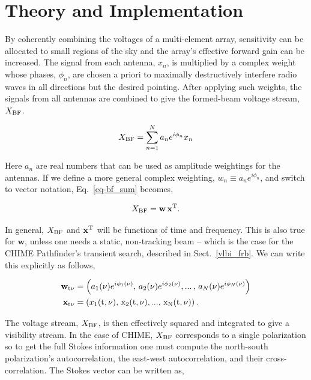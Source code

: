   
\section{Theory and Implementation}
\label{sec:theory}

By coherently combining the voltages of a multi-element array, 
sensitivity can be allocated to small regions of the sky and 
the array's effective forward gain can be increased. The signal 
from each antenna, $x_n$, is multiplied by a complex weight whose 
phases, $\phi_{n}$, are chosen a priori to maximally destructively interfere radio waves 
in all directions but the desired pointing. After applying 
such weights, the signals 
from all antennas are combined to give the formed-beam 
voltage stream, $X_{\rm BF}$.

\begin{equation}
\label{eq-bf_sum}
X_{\rm BF} = \sum_{{n}=1}^N a_n e^{i\phi_{n}} x_n
\end{equation}

\noindent Here $a_n$ are real numbers that can be used as 
amplitude weightings for the antennas. If we define a more 
general complex weighting, $w_n \equiv a_n e^{i\phi_{n}}$, and 
switch to vector notation, Eq.~\ref{eq-bf_sum} becomes,

\begin{equation}
X_{\rm BF} = \mathbf{w} \, \mathbf{x}^{\rm T} .
\end{equation}

\noindent In general, $X_{\rm BF}$ and $\mathbf{x}^{\rm T}$ will be 
functions of time and frequency. This is also true for $\mathbf{w}$,
unless one needs a static, non-tracking beam -- which is the case for the 
CHIME Pathfinder's transient search, described in
Sect.~\ref{vlbi_frb}. We can write this explicitly as follows,


\begin{align}
     \mathbf{w}_{\rm t \nu} &= \left (a_1(\nu) e^{i \phi_1(\nu)}, \, 
     a_2(\nu) e^{i \phi_2(\nu)}, ... \,, \,a_N(\nu) e^{i \phi_N(\nu)} \right )\\
     \mathbf{x}_{\rm t \nu} &= \left ( x_1(\rm{t}, \nu), \, x_2(\rm{t}, \nu), 
     ..., \, x_N(\rm{t}, \nu) \right ).
\end{align}

The voltage stream, $X_{\rm BF}$, is then effectively squared and integrated 
to give a visibility stream. 
In the case of CHIME, $X_{\rm BF}$ corresponds to a single polarization 
so to get the full Stokes information one must compute the 
north-south polarization's autocorrelation, the east-west autocorrelation, 
and their cross-correlation. The Stokes vector can be written as,

